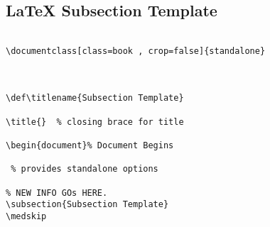 \documentclass[class=book , crop=false]{standalone}
\title{}  %
\def\titlename{Subsection Template}
\begin{document}

\ifstandalone
\maketitle %
\clearpage
\tableofcontents %
\clearpage
\fi

\subsection{\LaTeX{} Subsection Template}
\medskip 
	
\begin{verbatim}

\documentclass[class=book , crop=false]{standalone}



\def\titlename{Subsection Template}

\title{}  % closing brace for title

\begin{document}% Document Begins

 % provides standalone options

% NEW INFO GOs HERE.
\subsection{Subsection Template}
\medskip 

\end{verbatim}
\end{document}
